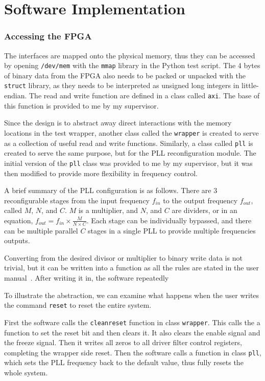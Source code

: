 \chapter{Software Implementation}

\subsection{Accessing the FPGA}
The interfaces are mapped onto the physical memory, thus they can be accessed by opening \texttt{/dev/mem} with the \texttt{mmap} library in the Python test script.
The 4 bytes of binary data from the FPGA also needs to be packed or unpacked with the \texttt{struct} library, as they needs to be interpreted as unsigned long integers in little-endian.
The read and write function are defined in a class called \texttt{axi}.
The base of this function is provided to me by my supervisor.

Since the design is to abstract away direct interactions with the memory locations in the test wrapper, another class called the \texttt{wrapper} is created to serve as a collection of useful read and write functions.
Similarly, a class called \texttt{pll} is created to serve the same purpose, but for the PLL reconfiguration module.
The initial version of the \texttt{pll} class was provided to me by my supervisor, but it was then modified to provide more flexibility in frequency control.

A brief summary of the PLL configuration is as follows.
There are 3 reconfigurable stages from the input frequency $f_{in}$ to the output frequency $f_{out}$, called $M$, $N$, and $C$.
$M$ is a multiplier, and $N$, and $C$ are dividers, or in an equation,
$f_{out} = f_{in} \times \frac{M}{N \times C}$.
Each stage can be individually bypassed, and there can be multiple parallel $C$ stages in a single PLL to provide multiple frequencies outputs.

Converting from the desired divisor or multiplier to binary write data is not trivial, but it can be written into a function as all the rules are stated in the user manual~\cite{Altera7}.
After writing it in, the software repeatedly

To illustrate the abstraction, we can examine what happens when the user writes the command \texttt{reset} to reset the entire system.

First the software calls the \texttt{cleanreset} function in class \texttt{wrapper}.
This calls the a function to set the reset bit and then clears it.
It also clears the enable signal and the freeze signal.
Then it writes all zeros to all driver filter control registers, completing the wrapper side reset.
Then the software calls a function in class \texttt{pll}, which sets the PLL frequency back to the default value, thus fully resets the whole system.

